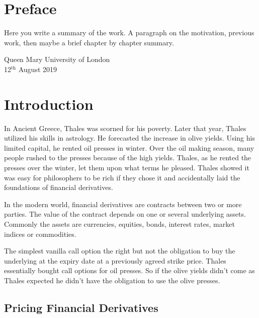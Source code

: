 \documentclass[12pt, oneside]{book}
\theoremstyle{plain}
\theoremstyle{definition}
\begin{document}
\chapter*{Preface}
Here  you write a summary of the work. A paragraph on the motivation, previous work, then maybe a brief chapter by chapter summary. 

\lipsum[100]%



\begin{flushright}
Queen Mary University of London\\
12${}^{\text{th}}$ August 2019
\end{flushright}


\tableofcontents

\chapter{Introduction}
In Ancient Greece, Thales was scorned for his poverty. Later that year, Thales utilized his skills in astrology. He forecasted the increase in olive yields. Using his limited capital, he rented oil presses in winter. Over the oil making season, many people rushed to the presses because of the high yields. Thales, as he rented the presses over the winter, let them upon what terms he pleased. Thales showed it was easy for philosophers to be rich if they chose it and accidentally laid the foundations of financial derivatives. \cite{Thalesians}

In the modern world, financial derivatives are contracts between two or more parties. The value of the contract depends on one or several underlying assets. Commonly the assets are currencies, equities, bonds, interest rates, market indices or commodities.

The simplest vanilla call option the right but not the obligation to buy the underlying at the expiry date at a previously agreed strike price. Thales essentially bought call options for oil presses.  So if the olive yields didn't come as Thales expected he didn't have the obligation to use the olive presses.

\section{Pricing Financial Derivatives}\label{Pricing Financial Derivatives}
\end{document}

